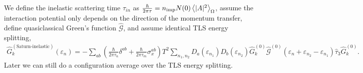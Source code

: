 \documentclass[]{article}
\begin{document}
We define the inelastic scattering time $\tau_{in}$ as $\frac{\hbar}{2\pi\tau}=n_\text{imp}N(0)\ev{|A|^2}_\Omega$,
assume the interaction potential only depends on the direction of the momentum transfer,
define quasiclassical Green's function $\widehat{\mathcal{G}}$, and assume identical TLS energy splitting,
\begin{align}
    \widehat{G}^{(\text{Saturn-inelastic})}_{k}(\varepsilon_n)
    = -\sum_{ab}
    \left(\frac{\hbar}{2\pi\tau_n}\delta^{ab} + \frac{\hbar}{2\pi\tau_m}\sigma_x^{ab}\right)
    T^2\sum_{n_1,n_2}
    D_a(\varepsilon_{n_1})D_b(\varepsilon_{n_2})
    \widehat{G}^{(0)}_k
    \widehat{\mathcal{G}}^{(0)}(\varepsilon_n+\varepsilon_{n_2}-\varepsilon_{n_1})
    \widehat{\tau}_3
    \widehat{G}^{(0)}_k.
\end{align}
Later we can still do a configuration average over the TLS energy splitting.
\end{document}
